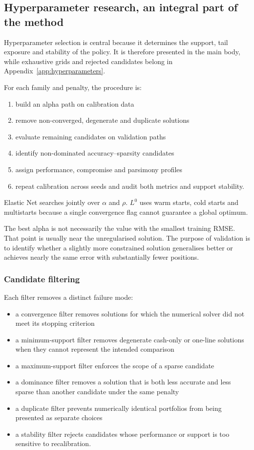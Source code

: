 \documentclass[12pt,a4paper]{article}
\newcommand{\1}{\mathbf{1}}
\begin{document}
\subsection{Hyperparameter research, an integral part of the method}

Hyperparameter selection is central because it determines the support, tail exposure and stability of the policy. It is therefore presented in the main body, while exhaustive grids and rejected candidates belong in Appendix~\ref{app:hyperparameters}.

For each family and penalty, the procedure is:

\begin{enumerate}
\item build an alpha path on calibration data
\item remove non-converged, degenerate and duplicate solutions
\item evaluate remaining candidates on validation paths
\item identify non-dominated accuracy--sparsity candidates
\item assign performance, compromise and parsimony profiles
\item repeat calibration across seeds and audit both metrics and support stability.
\end{enumerate}

Elastic Net searches jointly over $\alpha$ and $\rho$. $L^0$ uses warm starts, cold starts and multistarts because a single convergence flag cannot guarantee a global optimum.

The best alpha is not necessarily the value with the smallest training RMSE.
That point is usually near the unregularised solution. The purpose of
validation is to identify whether a slightly more constrained solution
generalises better or achieves nearly the same error with substantially fewer
positions.

\subsubsection*{Candidate filtering}

Each filter removes a distinct failure mode:

\begin{itemize}
\item a convergence filter removes solutions for which the numerical solver
did not meet its stopping criterion
\item a minimum-support filter removes degenerate cash-only or one-line
solutions when they cannot represent the intended comparison
\item a maximum-support filter enforces the scope of a sparse candidate
\item a dominance filter removes a solution that is both less accurate and
less sparse than another candidate under the same penalty
\item a duplicate filter prevents numerically identical portfolios from being
presented as separate choices
\item a stability filter rejects candidates whose performance or support is
too sensitive to recalibration.
\end{itemize}
\end{document}
